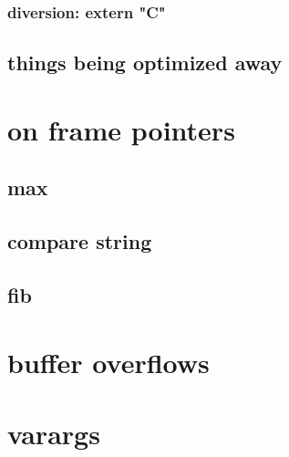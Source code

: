 \subsubsection{diversion: extern "C"}





\subsection{things being optimized away}



\section{on frame pointers}



\subsection{max}







\subsection{compare string}





\subsection{fib}





\section{buffer overflows}



\section{varargs}




